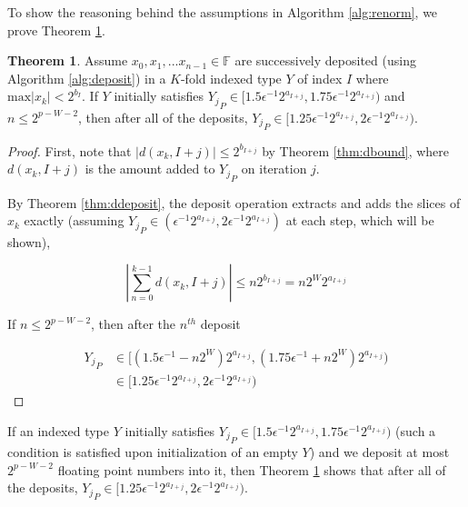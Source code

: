 \documentclass[12pt]{article}
\providecommand{\F}{\ensuremath{\mathbb{F}}}
\providecommand{\max}{\ensuremath{\text{max}}}
\theoremstyle{definition}
\newtheorem{thm}{Theorem}[section]
\numberwithin{equation}{section}
\numberwithin{figure}{section}
\begin{document}
    To show the reasoning behind the assumptions in Algorithm \ref{alg:renorm}, we prove Theorem \ref{thm:renormfreq}.

      \begin{samepage}
    \begin{thm}
      Assume $x_0, x_1, ... x_{n - 1} \in \F$ are successively deposited (using Algorithm \ref{alg:deposit}) in a $K$-fold indexed type $Y$ of index $I$ where $\max|x_k| < 2^{b_I}$. If $Y$ initially satisfies ${Y_j}_P \in [1.5  \epsilon^{-1} 2^{a_{I + j}}, 1.75  \epsilon^{-1} 2^{a_{I + j}})$ and $n \leq 2^{p - W - 2}$, then after all of the deposits, ${Y_j}_P \in [1.25  \epsilon^{-1} 2^{a_{I + j}}, 2  \epsilon^{-1} 2^{a_{I + j}})$.
      \label{thm:renormfreq}
    \end{thm}
    \end{samepage}

    \begin{proof}
    First, note that $|d(x_k, I + j)| \leq 2^{b_{I + j}}$ by Theorem \ref{thm:dbound}, where $d(x_k, I + j)$ is the amount added to ${Y_j}_P$ on iteration $j$.

    By Theorem \ref{thm:ddeposit}, the deposit operation extracts and adds the slices of $x_k$ exactly (assuming ${Y_j}_P \in (\epsilon^{-1} 2^{a_{I + j}}, 2  \epsilon^{-1} 2^{a_{I + j}})$ at each step, which will be shown),

    \begin{equation*}
    |\sum \limits_{n = 0}^{k - 1} d(x_k, I + j)| \leq n  2^{b_{I + j}} = n  2^{W}  2^{a_{I + j}}
    \end{equation*}

    If $n \leq 2^{p - W - 2}$, then after the $n^{th}$ deposit

    \begin{align*}
    {Y_j}_P &\in [(1.5  \epsilon^{-1} - n  2^W) 2^{a_{I + j}}, (1.75  \epsilon^{-1} + n  2^W) 2^{a_{I + j}}) \\
    &\in [1.25  \epsilon^{-1} 2^{a_{I + j}}, 2  \epsilon^{-1} 2^{a_{I + j}})
    \end{align*}
    \end{proof}

    If an indexed type $Y$ initially satisfies ${Y_j}_P \in [1.5  \epsilon^{-1} 2^{a_{I + j}}, 1.75  \epsilon^{-1} 2^{a_{I + j}})$ (such a condition is satisfied upon initialization of an empty $Y$) and we deposit at most $2^{p - W - 2}$ floating point numbers into it, then Theorem \ref{thm:renormfreq} shows that after all of the deposits, ${Y_j}_P \in [1.25  \epsilon^{-1} 2^{a_{I + j}}, 2  \epsilon^{-1} 2^{a_{I + j}})$.
\end{document}
